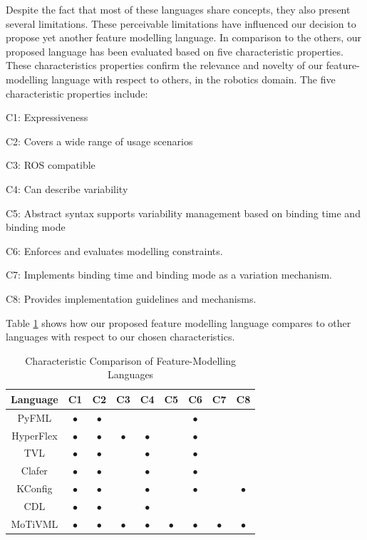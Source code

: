 \documentclass[conference]{IEEEtran}
\begin{document}
Despite the fact that most of these languages share concepts, they also present several limitations. These perceivable limitations have influenced our decision to propose yet another feature modelling language. In comparison to the others, our proposed language has been evaluated based on five characteristic properties. These characteristics properties confirm the relevance and novelty of our feature-modelling language with respect to others, in the robotics domain. The five characteristic properties include:
\begin{enumerate*}[label=(\roman*)]
	\item C1: Expressiveness
	\item C2: Covers a wide range of usage scenarios
	\item C3: ROS compatible
	\item C4: Can describe variability
	\item C5: Abstract syntax supports variability management based on binding time and binding mode
	\item C6: Enforces and evaluates modelling constraints.
	\item C7: Implements binding time and binding mode as a variation mechanism.
	\item C8: Provides implementation guidelines and mechanisms.
\end{enumerate*}

Table \ref{tab:compfml} shows how our proposed feature modelling language compares to other languages with respect to our chosen characteristics.
\begin{table}[htbp]
\caption{Characteristic Comparison of Feature-Modelling Languages}
\begin{center}
\begin{tabular}{|c|c|c|c|c|c|c|c|c|}
\hline
    Language & C1 & C2 & C3 & C4 & C5 & C6 & C7 & C8 \\ \hline
    PyFML & $\bullet$ & $\bullet$ &  &  & & $\bullet$ & &\\\hline
    HyperFlex & $\bullet$ & $\bullet$ & $\bullet$ & $\bullet$ &  & $\bullet$ & &\\\hline
    TVL & $\bullet$ & $\bullet$ &  & $\bullet$ & & $\bullet$ & &\\ \hline
    Clafer & $\bullet$ & $\bullet$ &  & $\bullet$ &  & $\bullet$ & &\\ \hline
    KConfig & $\bullet$ & $\bullet$ & & $\bullet$ &  & $\bullet$ & & $\bullet$\\ \hline
    CDL & $\bullet$ & $\bullet$ &  &  $\bullet$ &  & & &\\ \hline
    MoTiVML & $\bullet$ & $\bullet$ & $\bullet$ & $\bullet$ & $\bullet$ & $\bullet$ & $\bullet$ & $\bullet$\\ \hline
\end{tabular}
\label{tab:compfml}
\end{center}
\end{table}
\end{document}
